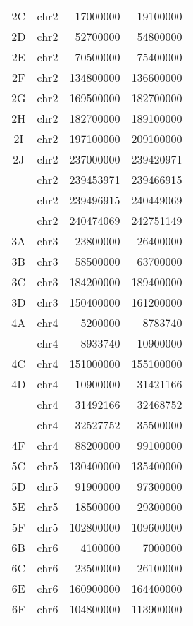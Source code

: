 \begin{center}
\begin{longtable}{@{\extracolsep{\fill}}ccrr}
  2C     & chr2       & 17000000  & 19100000 \\
  2D     & chr2       & 52700000  & 54800000 \\
  2E     & chr2       & 70500000  & 75400000 \\
  2F     & chr2       & 134800000 & 136600000 \\
  2G     & chr2       & 169500000 & 182700000 \\
  2H     & chr2       & 182700000 & 189100000 \\
  2I     & chr2       & 197100000 & 209100000 \\
  2J     & chr2       & 237000000 & 239420971 \\
         & chr2       & 239453971 & 239466915 \\
         & chr2       & 239496915 & 240449069 \\
         & chr2       & 240474069 & 242751149 \\
  3A     & chr3       & 23800000  & 26400000 \\
  3B     & chr3       & 58500000  & 63700000 \\
  3C     & chr3       & 184200000 & 189400000 \\
  3D     & chr3       & 150400000 & 161200000 \\
  4A     & chr4       & 5200000   & 8783740 \\
         & chr4       & 8933740   & 10900000 \\
  4C     & chr4       & 151000000 & 155100000 \\
  4D     & chr4       & 10900000  & 31421166 \\
         & chr4       & 31492166  & 32468752 \\
         & chr4       & 32527752  & 35500000 \\
  4F     & chr4       & 88200000  & 99100000 \\
  5C     & chr5       & 130400000 & 135400000 \\
  5D     & chr5       & 91900000  & 97300000 \\
  5E     & chr5       & 18500000  & 29300000 \\
  5F     & chr5       & 102800000 & 109600000 \\
  6B     & chr6       & 4100000   & 7000000 \\
  6C     & chr6       & 23500000  & 26100000 \\
  6E     & chr6       & 160900000 & 164400000 \\
  6F     & chr6       & 104800000 & 113900000 \\

\end{longtable}
\end{center}
